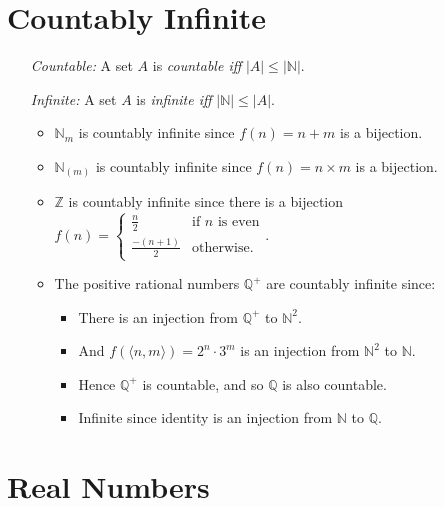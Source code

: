 \documentclass[a4paper, 11pt]{article} %
\newcommand{\tuple}[1]{\langle#1\rangle} %
\newcommand{\abs}[1]{|#1|} %
\newcommand{\N}{\mathbb{N}}
\newcommand{\Z}{\mathbb{Z}}
\renewcommand{\Pr}{\mathbb{P}}
\newcommand{\Q}{\mathbb{Q}}
\begin{document}
\begin{enumerate}
\section*{Countably Infinite}

\begin{enumerate}
  \item[\it Countable:] A set $A$ is \textit{countable iff} $\abs{A} \leq \abs{\N}$.
  \item[\it Infinite:] A set $A$ is \textit{infinite iff} $\abs{\N} \leq \abs{A}$.
    \begin{itemize}[leftmargin=-.2in]
      \item $\N_m$ is countably infinite since $f(n) = n + m$ is a bijection.  
      \item $\N_{(m)}$ is countably infinite since $f(n) = n \times m$ is a bijection.
      \item $\Z$ is countably infinite since there is a bijection $f(n) = 
        \begin{cases}
          \frac{n}{2}       & \text{if } n \text{ is even}\\
          \frac{-(n+1)}{2}  & \text{otherwise.}
        \end{cases}$.
      \item The positive rational numbers $\Q^+$ are countably infinite since: 
        \begin{itemize}
          \item There is an injection from $\Q^+$ to $\N^2$. 
          \item And $f(\tuple{n,m})=2^n \cdot 3^m$ is an injection from $\N^2$ to $\N$.
          \item Hence $\Q^+$ is countable, and so $\Q$ is also countable. 
          \item Infinite since identity is an injection from $\N$ to $\Q$. 
        \end{itemize}
    \end{itemize}
\end{enumerate}




\section*{Real Numbers}


\end{enumerate}
\end{document}
